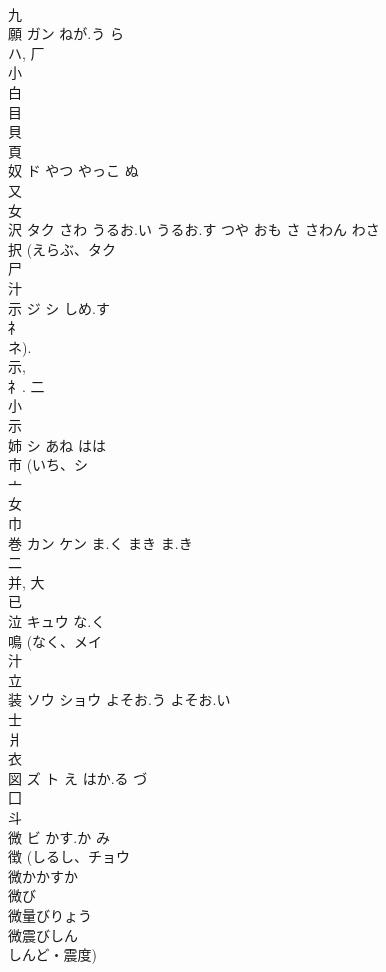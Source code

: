 \documentclass[8pt]{extreport}
\begin{document}
\begin{CJK}{UTF8}{min}
\\	九 
\\	願	ガン	ねが.う ら	
\\	ハ, 厂 
\\	小 
\\	白 
\\	目 
\\	貝 
\\	頁 
\\	奴	ド	やつ やっこ ぬ	
\\	又 
\\	女 
\\	沢	タク	さわ うるお.い うるお.す つや おも さ さわん わさ	
\\	択 (えらぶ、タク 
\\	尸 
\\	汁 
\\	示	ジ シ	しめ.す	
\\	礻 
\\	ネ). 
\\	示, 
\\	礻.			二 
\\	小 
\\	示 
\\	姉	シ	あね はは	
\\	市 (いち、シ 
\\	亠 
\\	女 
\\	巾 
\\	巻	カン ケン	ま.く まき ま.き	
\\	二 
\\	并, 大 
\\	已 
\\	泣	キュウ	な.く	
\\	鳴 (なく、メイ 
\\	汁 
\\	立 
\\	装	ソウ ショウ	よそお.う よそお.い	
\\	士 
\\	爿 
\\	衣 
\\	図	ズ ト	え はか.る づ	
\\	囗 
\\	斗 
\\	微	ビ	かす.か み	
\\	徴 (しるし、チョウ 
\\	微かかすか 
\\	微び 
\\	微量びりょう 
\\	微震びしん 
\\	しんど・震度) 

\end{CJK}
\end{document}
